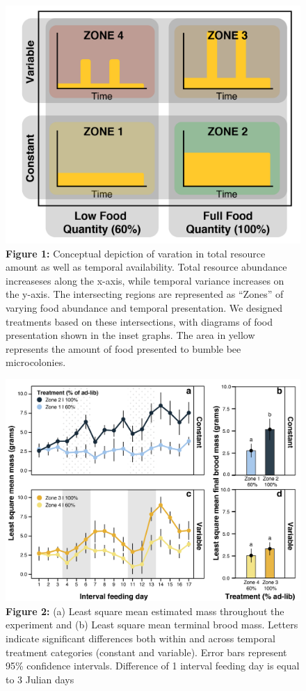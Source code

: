 \documentclass[11pt,]{article}
\begin{document}
\begin{figure}
\centering
\includegraphics{./fig1_conceptual.png}
\caption{\textbf{Figure 1:} Conceptual depiction of varation in total
resource amount as well as temporal availability. Total resource
abundance increaseses along the x-axis, while temporal variance
increases on the y-axis. The intersecting regions are represented as
``Zones'' of varying food abundance and temporal presentation. We
designed treatments based on these intersections, with diagrams of food
presentation shown in the inset graphs. The area in yellow represents
the amount of food presented to bumble bee microcolonies.}
\end{figure}

\clearpage

\newpage

\begin{figure}
\centering
\includegraphics{./fig2_mc_mass.png}
\caption{\textbf{Figure 2:} (a) Least square mean estimated mass
throughout the experiment and (b) Least square mean terminal brood mass.
Letters indicate significant differences both within and across temporal
treatment categories (constant and variable). Error bars represent 95\%
confidence intervals. Difference of 1 interval feeding day is equal to 3
Julian days}
\end{figure}
\end{document}

